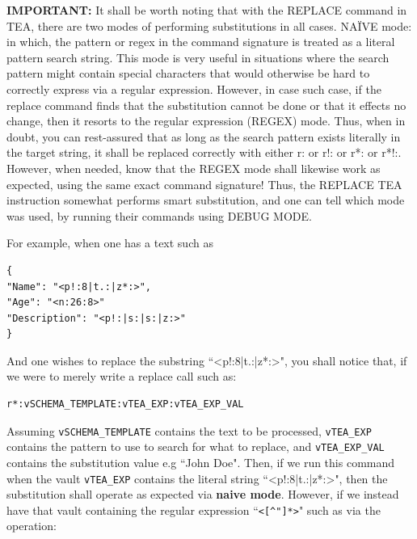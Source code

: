 \documentclass[a4paper, 18pt]{book} %
\begin{document}
{{{\vspace{2em}

\textbf{IMPORTANT:} It shall be worth noting that with the REPLACE command in TEA, there are two modes of performing substitutions in all cases. NAÏVE mode: in which, the pattern or regex in the command signature is treated as a literal pattern search string. This mode is very useful in situations where the search pattern might contain special characters that would otherwise be hard to correctly express via a regular expression. However, in case such case, if the replace command finds that the substitution cannot be done or that it effects no change, then it resorts to the regular expression (REGEX) mode. Thus, when in doubt, you can rest-assured that as long as the search pattern exists literally in the target string, it shall be replaced correctly with either r: or r!: or r*: or r*!:. However, when needed, know that the REGEX mode shall likewise work as expected, using the same exact command signature! Thus, the REPLACE TEA instruction somewhat performs smart substitution, and one can tell which mode was used, by running their commands using DEBUG MODE. 

\vspace{2em}

For example, when one has a text such as

\vspace{2em}

\begin{verbatim}
{
"Name": "<p!:8|t.:|z*:>",
"Age": "<n:26:8>"
"Description": "<p!:|s:|s:|z:>"
}
\end{verbatim}

\vspace{2em}

And one wishes to replace the substring ``<p!:8|t.:|z*:>", you shall notice that, if we were to merely write a replace call such as:
  
\vspace{1em}

  \begin{tcolorbox}[teaterminalstyle, title=R: EXAMPLE 1: Using R*:, breakable]
  \begin{lstlisting}[language=TEA,breaklines=true,]
r*:vSCHEMA_TEMPLATE:vTEA_EXP:vTEA_EXP_VAL
   \end{lstlisting}
  \end{tcolorbox}

\vspace{1em}

Assuming \texttt{vSCHEMA\_TEMPLATE} contains the text to be processed,  \texttt{vTEA\_EXP} contains the pattern to use to search for what to replace, and  \texttt{vTEA\_EXP\_VAL} contains the substitution value e.g ``John Doe". Then, if we run this command when the vault \texttt{vTEA\_EXP} contains the literal string ``<p!:8|t.:|z*:>", then the substitution shall operate as expected via \textbf{naive mode}. However, if we instead have that vault containing the regular expression ``\verb|<[^"]*>|" such as via the operation:


}}}
\end{document}

